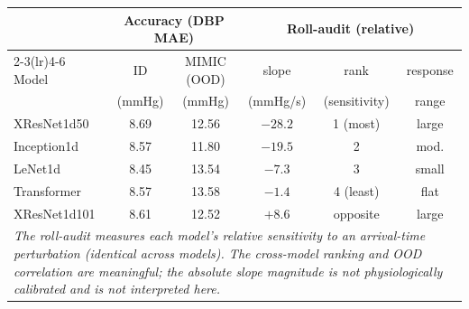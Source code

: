 \documentclass[border=8pt]{standalone}
\begin{document}
\begin{tabular}{lccccc}
\toprule
 & \multicolumn{2}{c}{Accuracy (DBP MAE)} & \multicolumn{3}{c}{Roll-audit (relative)} \\
\cmidrule(lr){2-3}\cmidrule(lr){4-6}
Model & ID & MIMIC (OOD) & slope & rank & response \\
      & (mmHg) & (mmHg) & (mmHg/s) & (sensitivity) & range \\
\midrule
XResNet1d50  & 8.69 & 12.56 & $-28.2$ & 1 (most) & large \\
Inception1d  & 8.57 & 11.80 & $-19.5$ & 2 & mod. \\
LeNet1d      & 8.45 & 13.54 & $-7.3$  & 3 & small \\
Transformer  & 8.57 & 13.58 & $-1.4$  & 4 (least) & flat \\
XResNet1d101 & 8.61 & 12.52 & $+8.6$  & opposite & large \\
\midrule
\multicolumn{6}{p{0.86\linewidth}}{\itshape\footnotesize The roll-audit measures each model's
\emph{relative} sensitivity to an arrival-time perturbation (identical across models). The
cross-model ranking and OOD correlation are meaningful; the absolute slope magnitude is not
physiologically calibrated and is not interpreted here.} \\
\bottomrule
\end{tabular}
\end{document}
